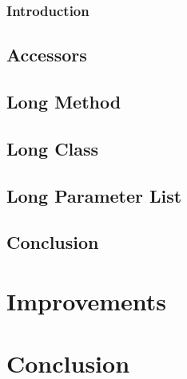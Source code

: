 \documentclass[11pt,a4paper]{article}
\begin{document}
\subsubsection{Introduction} 
\subsection{Accessors} 
\subsection{Long Method}
\subsection{Long Class}
\subsection{Long Parameter List}
\subsection{Conclusion}
\section{Improvements}
\section{Conclusion}
\end{document}
